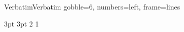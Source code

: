 \usepackage{fancyvrb}
\RecustomVerbatimEnvironment
{Verbatim}{Verbatim}
{gobble=6, numbers=left, frame=lines}
\usepackage[shortlabels]{enumitem}
\usepackage{amsmath}
\usepackage{amsthm}
\usepackage{metalogo}
\usepackage{mdwlist}
\usepackage[a4paper,left=2.5cm,right=2.5cm,top=2.5cm,bottom=2cm]{geometry} %
{3pt}%
{3pt}%
{}%
{2\ccwd}%
{\bfseries}%
{}%
{1\ccwd}%
{}%
\theoremstyle{normal}
\newtheorem{Remark}{注}[section]
\renewcommand{\emph}[1]{\textbf{#1}}